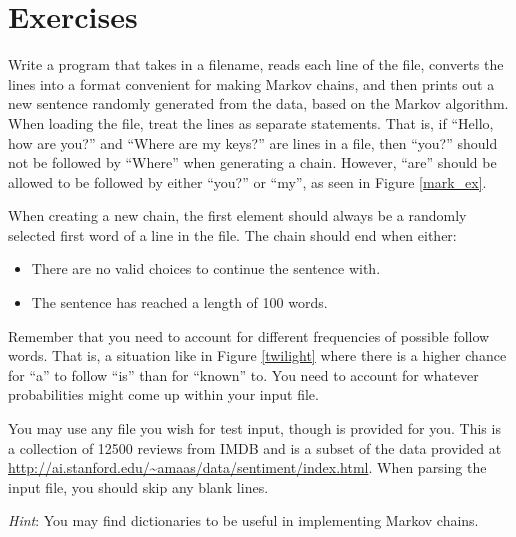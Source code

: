 \documentclass[11pt]{cselabheader}
\begin{document}
\section{Exercises}
\label{sec:ex}


\begin{ex}[markov.py] Write a program that takes in a filename, reads each line of the file, converts the lines into a format convenient for making Markov chains, and then prints out a new sentence randomly generated from the data, based on the Markov algorithm. When loading the file, treat the lines as separate statements. That is, if ``Hello, how are you?'' and ``Where are my keys?'' are lines in a file, then ``you?'' should not be followed by ``Where'' when generating a chain. However, ``are'' should be allowed to be followed by either ``you?'' or ``my'', as seen in Figure \ref{mark_ex}.

  When creating a new chain, the first element should always be a randomly selected first word of a line in the file. The chain should end when either:
  \begin{itemize}
  \item There are no valid choices to continue the sentence with.
  \item The sentence has reached a length of 100 words.
  \end{itemize}

  Remember that you need to account for different frequencies of possible
  follow words. That is, a situation like in Figure \ref{twilight} where
  there is a higher chance for ``a'' to follow ``is'' than for ``known''
  to. You need to account for whatever probabilities might come up within
  your input file.

  You may use any file you wish for test input, though  is provided for you. This is a collection of 12500 reviews from IMDB and is a subset of the data provided at \url{http://ai.stanford.edu/~amaas/data/sentiment/index.html}. When parsing the input file, you should skip any blank lines.

  \emph{Hint}: You may find dictionaries to be useful in implementing
  Markov chains.

\end{ex}
\end{document}
